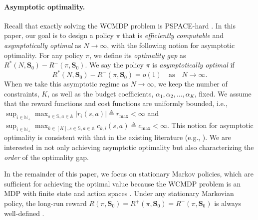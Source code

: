 \documentclass{article}
\theoremstyle{plain}
\theoremstyle{remark}
\newcommand{\sspa}{\mathbb{S}}
\newcommand{\aspa}{\mathbb{A}}
\begin{document}
\paragraph{Asymptotic optimality.}
Recall that exactly solving the WCMDP problem is PSPACE-hard \citep{PapTsi_99_pspace}. 
In this paper, our goal is to design a policy $\pi$ that is \emph{efficiently computable} and \emph{asymptotically optimal} as $N\to\infty$, with the following notion for asymptotic optimality.
For any policy $\pi$, we define its \emph{optimality gap} as $R^*(N,\bm{S}_0)-R^-(\pi,\bm{S}_0)$.
We say the policy $\pi$ is \emph{asymptotically optimal} if 
\begin{equation}
    R^*(N,\bm{S}_0)-R^-(\pi,\bm{S}_0)=o(1) \quad \text{as} \quad N\to\infty.
\end{equation}
When we take this asymptotic regime as $N\to\infty$, we keep the number of constraints, $K$, as well as the budget coefficients, $\alpha_1,\alpha_2,\dots,\alpha_K$, fixed.
We assume that the reward functions and cost functions are uniformly bounded, i.e., $\sup_{i\in\mathbb{N}_+}\max_{s\in\sspa,a\in\aspa}|r_i(s,a)|\triangleq r_{\max}<\infty$
and
$\sup_{i\in\mathbb{N}_+}\max_{k\in[K],s\in\sspa,a\in\aspa}c_{k,i}(s,a)\triangleq c_{\max}<\infty$.
This notion for asymptotic optimality is consistent with that in the existing literature (e.g., \citep[Definition 4.11]{Ver_16_verloop}). We are interested in not only achieving asymptotic optimality but also characterizing the \emph{order} of the optimality gap.


In the remainder of this paper, we focus on stationary Markov policies, which are sufficient for achieving the optimal value because the WCMDP problem is an MDP with finite state and action spaces \citep[][Theorem 9.1.8]{Put_05}. 
Under any stationary Markovian policy, the long-run reward $R(\pi,\bm{S}_0)= R^+(\pi,\bm{S}_0) = R^-(\pi,\bm{S}_0)$ is always well-defined \citep[][Theorem 8.1.1]{Put_05}.
\end{document}
